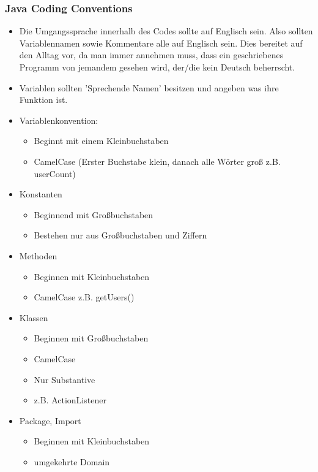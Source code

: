 \documentclass{article}
\begin{document}
	\subsubsection{Java Coding Conventions}
	\begin{itemize}
		\item{Die Umgangssprache innerhalb des Codes sollte auf Englisch sein. Also sollten Variablennamen sowie Kommentare alle auf Englisch sein. Dies bereitet auf den Alltag vor, da man immer annehmen muss, dass ein geschriebenes Programm von jemandem gesehen wird, der/die kein Deutsch beherrscht.}
		\item{Variablen sollten 'Sprechende Namen' besitzen und angeben was ihre Funktion ist.}
		\item{Variablenkonvention:}
		\begin{itemize}
			\item{Beginnt mit einem Kleinbuchstaben}
			\item{CamelCase (Erster Buchstabe klein, danach alle Wörter groß z.B. userCount)}
		\end{itemize}
		\item{Konstanten}
		\begin{itemize}
			\item{Beginnend mit Großbuchstaben}
			\item{Bestehen nur aus Großbuchstaben und Ziffern}
		\end{itemize}
		\item{Methoden}
		\begin{itemize}
			\item{Beginnen mit Kleinbuchstaben}
			\item{CamelCase z.B. getUsers()}
		\end{itemize}
		\item{Klassen}
		\begin{itemize}
			\item{Beginnen mit Großbuchstaben}
			\item{CamelCase}
			\item{Nur Substantive}
			\item{z.B. ActionListener}
		\end{itemize}
		\item{Package, Import}
		\begin{itemize}
			\item{Beginnen mit Kleinbuchstaben}
			\item{umgekehrte Domain}
		\end{itemize}
	\end{itemize}
\end{document}
